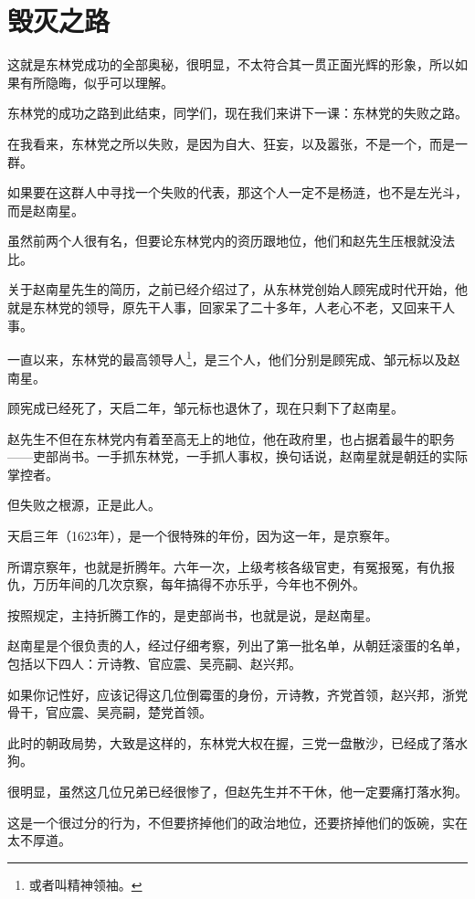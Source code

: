 \section{毁灭之路}
\ifnum{}
	\begin{multicols}{\theparacolNo}
\fi
这就是东林党成功的全部奥秘，很明显，不太符合其一贯正面光辉的形象，所以如果有所隐晦，似乎可以理解。

东林党的成功之路到此结束，同学们，现在我们来讲下一课：东林党的失败之路。

在我看来，东林党之所以失败，是因为自大、狂妄，以及嚣张，不是一个，而是一群。

如果要在这群人中寻找一个失败的代表，那这个人一定不是杨涟，也不是左光斗，而是赵南星。

虽然前两个人很有名，但要论东林党内的资历跟地位，他们和赵先生压根就没法比。

关于赵南星先生的简历，之前已经介绍过了，从东林党创始人顾宪成时代开始，他就是东林党的领导，原先干人事，回家呆了二十多年，人老心不老，又回来干人事。

一直以来，东林党的最高领导人\footnote{或者叫精神领袖。}，是三个人，他们分别是顾宪成、邹元标以及赵南星。

顾宪成已经死了，天启二年，邹元标也退休了，现在只剩下了赵南星。

赵先生不但在东林党内有着至高无上的地位，他在政府里，也占据着最牛的职务——吏部尚书。一手抓东林党，一手抓人事权，换句话说，赵南星就是朝廷的实际掌控者。

但失败之根源，正是此人。

天启三年（1623年），是一个很特殊的年份，因为这一年，是京察年。

所谓京察年，也就是折腾年。六年一次，上级考核各级官吏，有冤报冤，有仇报仇，万历年间的几次京察，每年搞得不亦乐乎，今年也不例外。

按照规定，主持折腾工作的，是吏部尚书，也就是说，是赵南星。

赵南星是个很负责的人，经过仔细考察，列出了第一批名单，从朝廷滚蛋的名单，包括以下四人：亓诗教、官应震、吴亮嗣、赵兴邦。

如果你记性好，应该记得这几位倒霉蛋的身份，亓诗教，齐党首领，赵兴邦，浙党骨干，官应震、吴亮嗣，楚党首领。

此时的朝政局势，大致是这样的，东林党大权在握，三党一盘散沙，已经成了落水狗。

很明显，虽然这几位兄弟已经很惨了，但赵先生并不干休，他一定要痛打落水狗。

这是一个很过分的行为，不但要挤掉他们的政治地位，还要挤掉他们的饭碗，实在太不厚道。


\end{multicols}
